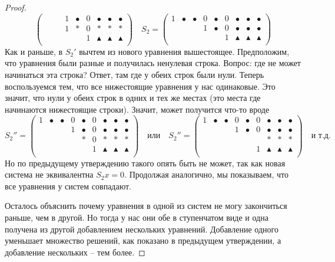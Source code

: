 \begin{proof}
\[\begin{pmatrix}
{}&{}&{}&{1}&{\bullet}&{0}&{\bullet}&{\bullet}&{\bullet}\\
{}&{}&{}&{1}&{*}&{0}&{*}&{*}&{*}\\
{}&{}&{}&{}&{}&{1}&{\blacktriangle}&{\blacktriangle}&{\blacktriangle}\\
\end{pmatrix}\quad
S_2 = 
\begin{pmatrix}
{1}&{\bullet}&{\bullet}&{0}&{\bullet}&{0}&{\bullet}&{\bullet}&{\bullet}\\
{}&{}&{}&{1}&{\bullet}&{0}&{\bullet}&{\bullet}&{\bullet}\\
{}&{}&{}&{}&{}&{1}&{\blacktriangle}&{\blacktriangle}&{\blacktriangle}\\
\end{pmatrix}
\]
Как и раньше, в $S_2'$ вычтем из нового уравнения вышестоящее. Предположим, что уравнения были разные и получилась ненулевая строка. Вопрос: где не может начинаться эта строка? Ответ, там где у обеих строк были нули. Теперь воспользуемся тем, что все нижестоящие уравнения у нас одинаковые. Это значит, что нули у обеих строк в одних и тех же местах (это места где начинаются нижестоящие строки). Значит, может получится что-то вроде
\[
S_2'' = 
\begin{pmatrix}
{1}&{\bullet}&{\bullet}&{0}&{\bullet}&{0}&{\bullet}&{\bullet}&{\bullet}\\
{}&{}&{}&{1}&{\bullet}&{0}&{\bullet}&{\bullet}&{\bullet}\\
{}&{}&{}&{}&{*}&{0}&{*}&{*}&{*}\\
{}&{}&{}&{}&{}&{1}&{\blacktriangle}&{\blacktriangle}&{\blacktriangle}\\
\end{pmatrix}\quad\text{или}\quad
S_2'' = 
\begin{pmatrix}
{1}&{\bullet}&{\bullet}&{0}&{\bullet}&{0}&{\bullet}&{\bullet}&{\bullet}\\
{}&{}&{}&{1}&{\bullet}&{0}&{\bullet}&{\bullet}&{\bullet}\\
{}&{}&{}&{}&{}&{}&{*}&{*}&{*}\\
{}&{}&{}&{}&{}&{1}&{\blacktriangle}&{\blacktriangle}&{\blacktriangle}\\
\end{pmatrix}\quad\text{и т.д.}
\]
Но по предыдущему утверждению такого опять быть не может, так как новая система не эквивалентна $S_2 x = 0$. Продолжая аналогично, мы показываем, что все уравнения у систем совпадают.

Осталось объяснить почему уравнения в одной из систем не могу закончиться раньше, чем в другой. Но тогда у нас они обе в ступенчатом виде и одна получена из другой добавлением нескольких уравнений. Добавление одного уменьшает множество решений, как показано в предыдущем утверждении, а добавление нескольких -- тем более.

\end{proof}

